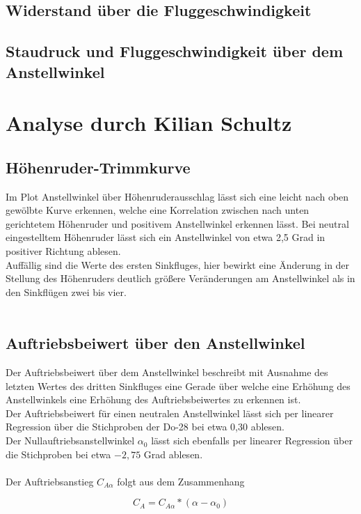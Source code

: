 \subsection{Widerstand über die Fluggeschwindigkeit}
\subsection{Staudruck und Fluggeschwindigkeit über dem Anstellwinkel}
\newpage

\section{Analyse durch Kilian Schultz}
\subsection{Höhenruder-Trimmkurve}
Im Plot Anstellwinkel über Höhenruderausschlag lässt sich eine leicht nach oben gewölbte Kurve erkennen, welche eine Korrelation zwischen nach unten gerichtetem Höhenruder und positivem Anstellwinkel erkennen lässt. Bei neutral eingestelltem Höhenruder lässt sich ein Anstellwinkel von etwa 2,5 Grad in positiver Richtung ablesen.\\
Auffällig sind die Werte des ersten Sinkfluges, hier bewirkt eine Änderung in der Stellung des Höhenruders deutlich größere Veränderungen am Anstellwinkel als in den Sinkflügen zwei bis vier.\\\\	

\subsection{Auftriebsbeiwert über den Anstellwinkel}
Der Auftriebsbeiwert über dem Anstellwinkel beschreibt mit Ausnahme des letzten Wertes des dritten Sinkfluges eine Gerade über welche eine Erhöhung des Anstellwinkels eine Erhöhung des Auftriebsbeiwertes zu erkennen ist.\\
Der Auftriebsbeiwert für einen neutralen Anstellwinkel lässt sich per linearer Regression über die Stichproben der Do-28 bei etwa 0,30 ablesen.\\
Der Nullauftriebsanstellwinkel $\alpha_{0}$ lässt sich ebenfalls per linearer Regression über die Stichproben bei etwa $-2,75$ Grad ablesen.\\\\
Der Auftriebsanstieg $C_{A\alpha}$ folgt aus dem Zusammenhang

\begin{equation*}
C_{A} = C_{A\alpha} * (\alpha-\alpha_{0})
\end{equation*}

